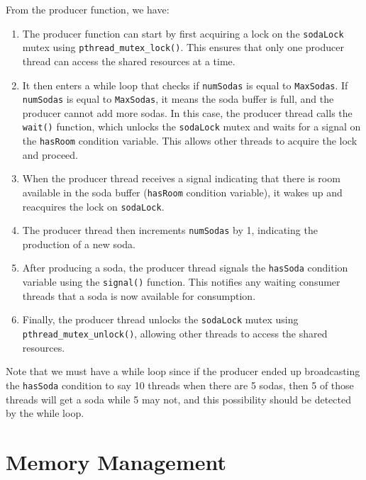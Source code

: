 \documentclass{article}
\begin{document}
\begin{example}
      From the producer function, we have: 

      \begin{enumerate}
        \item The producer function can start by first acquiring a lock on the \texttt{sodaLock} mutex using \texttt{pthread\_mutex\_lock()}. This ensures that only one producer thread can access the shared resources at a time.

        \item It then enters a while loop that checks if \texttt{numSodas} is equal to \texttt{MaxSodas}. If \texttt{numSodas} is equal to \texttt{MaxSodas}, it means the soda buffer is full, and the producer cannot add more sodas. In this case, the producer thread calls the \texttt{wait()} function, which unlocks the \texttt{sodaLock} mutex and waits for a signal on the \texttt{hasRoom} condition variable. This allows other threads to acquire the lock and proceed.

        \item When the producer thread receives a signal indicating that there is room available in the soda buffer (\texttt{hasRoom} condition variable), it wakes up and reacquires the lock on \texttt{sodaLock}.

        \item The producer thread then increments \texttt{numSodas} by 1, indicating the production of a new soda.

        \item After producing a soda, the producer thread signals the \texttt{hasSoda} condition variable using the \texttt{signal()} function. This notifies any waiting consumer threads that a soda is now available for consumption.

        \item Finally, the producer thread unlocks the \texttt{sodaLock} mutex using \texttt{pthread\_mutex\_unlock()}, allowing other threads to access the shared resources.

      \end{enumerate}
      Note that we must have a while loop since if the producer ended up broadcasting the \texttt{hasSoda} condition to say 10 threads when there are 5 sodas, then 5 of those threads will get a soda while 5 may not, and this possibility should be detected by the while loop. 
    \end{example}

\section{Memory Management}
\end{document}
